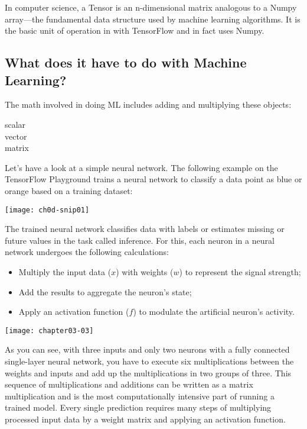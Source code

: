 In computer science, a Tensor is an n-dimensional matrix analogous to a Numpy array---the fundamental data structure used by machine learning algorithms. It is the basic unit of operation in with TensorFlow and in fact uses Numpy.

\subsection{What does it have to do with Machine Learning?}

The math involved in doing ML includes adding and multiplying these objects:

    scalar\\
    vector\\
    matrix

Let’s have a look at a simple neural network. The following example on the TensorFlow Playground \cite{GooglePlayground2019} trains a neural network to classify a data point as blue or orange based on a training dataset:

{\centering \texttt{[image: ch0d-snip01]} \par}

The trained neural network classifies data with labels or estimates missing or future values in the task called inference. For this, each neuron in a neural network undergoes the following calculations:

\begin{itemize}
\item Multiply the input data ($x$) with weights ($w$) to represent the signal strength;
\item Add the results to aggregate the neuron’s state;
\item Apply an activation function ($f$) to modulate the artificial neuron’s activity.
\end{itemize}

\begin{marginfigure}
\texttt{[image: chapter03-03]}
\end{marginfigure}


As you can see, with three inputs and only two neurons with a fully connected single-layer neural network, you have to execute six multiplications between the weights and inputs and add up the multiplications in two groups of three. This sequence of multiplications and additions can be written as a matrix multiplication and is the most computationally intensive part of running a trained model. Every single prediction requires many steps of multiplying processed input data by a weight matrix and applying an activation function.

